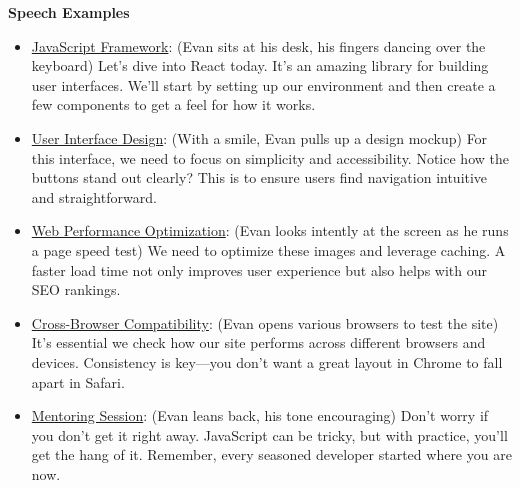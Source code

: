 \begin{figure*}[!htbp]
\begin{tcolorbox}
\textbf{Speech Examples}
\begin{itemize}
[leftmargin=*,noitemsep,topsep=0pt]
\item \underline{JavaScript Framework}: (Evan sits at his desk, his fingers dancing over the keyboard) Let’s dive into React today. It’s an amazing library for building user interfaces. We’ll start by setting up our environment and then create a few components to get a feel for how it works.
\item \underline{User Interface Design}: (With a smile, Evan pulls up a design mockup) For this interface, we need to focus on simplicity and accessibility. Notice how the buttons stand out clearly? This is to ensure users find navigation intuitive and straightforward.
\item \underline{Web Performance Optimization}: (Evan looks intently at the screen as he runs a page speed test) We need to optimize these images and leverage caching. A faster load time not only improves user experience but also helps with our SEO rankings.
\item \underline{Cross-Browser Compatibility}: (Evan opens various browsers to test the site) It's essential we check how our site performs across different browsers and devices. Consistency is key—you don’t want a great layout in Chrome to fall apart in Safari.
\item \underline{Mentoring Session}: (Evan leans back, his tone encouraging) Don’t worry if you don’t get it right away. JavaScript can be tricky, but with practice, you’ll get the hang of it. Remember, every seasoned developer started where you are now.
\end{itemize}


\end{tcolorbox}
\end{figure*}
